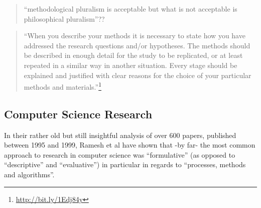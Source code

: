 \begin{quote}
  ``methodological pluralism is acceptable but what is not acceptable is philosophical pluralism''??
\end{quote}

\begin{comment}
  What would be traditional RM in those fields?\\
  Why can I not mix and match them?\\
  What do I do now/instead?\\
  Can inter/multi/trans-disciplinary research be NOT collaborative but done by a single person?
\end{comment}

\begin{quote}
  ``When you describe your methods it is necessary to state how you have addressed the research questions and/or hypotheses. The methods should be described in enough detail for the study to be replicated, or at least repeated in a similar way in another situation. Every stage should be explained and justified with clear reasons for the choice of your particular methods and materials.''\footnote{\url{http://bit.ly/1Edj84y}} %
\end{quote}

\subsection{Computer Science Research}

In their rather old but still insightful analysis of over 600 papers, published between 1995 and 1999, Ramesh et al \autocite{Ramesh2004} have shown that -by far- the most common approach to research in computer science was ``formulative'' (as opposed to ``descriptive'' and ``evaluative'') in particular in regards to ``processes, methods and algorithms''.

